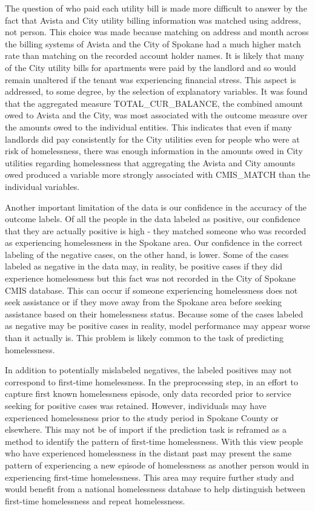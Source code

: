 \documentclass[10pt,letterpaper]{article}
\begin{document}
The question of who paid each utility bill is made more difficult to answer by the fact that Avista and City utility billing information was matched using address, not person. This choice was made because matching on address and month across the billing systems of Avista and the City of Spokane had a much higher match rate than matching on the recorded account holder names. It is likely that many of the City utility bills for apartments were paid by the landlord and so would remain unaltered if the tenant was experiencing financial stress. This aspect is addressed, to some degree, by the selection of explanatory variables. It was found that the aggregated measure TOTAL\_CUR\_BALANCE, the combined amount owed to Avista and the City, was most associated with the outcome measure over the amounts owed to the individual entities. This indicates that even if many landlords did pay consistently for the City utilities even for people who were at risk of homelessness, there was enough information in the amounts owed in City utilities regarding homelessness that aggregating the Avista and City amounts owed produced a variable more strongly associated with CMIS\_MATCH than the individual variables.

Another important limitation of the data is our confidence in the accuracy of the outcome labels. Of all the people in the data labeled as positive, our confidence that they are actually positive is high - they matched someone who was recorded as experiencing homelessness in the Spokane area. Our confidence in the correct labeling of the negative cases, on the other hand, is lower. Some of the cases labeled as negative in the data may, in reality, be positive cases if they did experience homelessness but this fact was not recorded in the City of Spokane CMIS database. This can occur if someone experiencing homelessness does not seek assistance or if they move away from the Spokane area before seeking assistance based on their homelessness status. Because some of the cases labeled as negative may be positive cases in reality, model performance may appear worse than it actually is. This problem is likely common to the task of predicting homelessness.

In addition to potentially mislabeled negatives, the labeled positives may not correspond to first-time homelessness. In the preprocessing step, in an effort to capture first known homelessness episode, only data recorded prior to service seeking for positive cases was retained. However, individuals may have experienced homelessness prior to the study period in Spokane County or elsewhere. This may not be of import if the prediction task is reframed as a method to identify the pattern of first-time homelessness. With this view people who have experienced homelessness in the distant past may present the same pattern of experiencing a new episode of homelessness as another person would in experiencing first-time homelessness. This area may require further study and would benefit from a national homelessness database to help distinguish between first-time homelessness and repeat homelessness.
\end{document}

